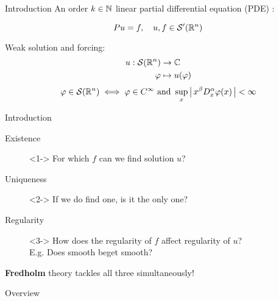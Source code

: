 \documentclass{beamer}
\begin{document}
\begin{frame}{Introduction}
An order $k \in {\ensuremath {\mathbb N}}$ linear partial differential equation (PDE) : 

\begin{equation*}
P u = f, \quad u, f \in \mathcal{S}'({\mathbb R}^n)
\end{equation*}


Weak solution and forcing: 
\begin{align*}
u : \mathcal{S}({\mathbb R}^n) & \to {\ensuremath {\mathbb C}} \\
\varphi &\mapsto u(\varphi)
\end{align*}
\begin{align*}
\varphi  \in \mathcal{S}({\mathbb R}^n)  \iff 
 \varphi \in C^\infty \text{ and }  \sup_{x} \left|\, x^\beta D^\alpha_x \varphi (x)\,\right| < \infty 
\end{align*}

\end{frame} 


\begin{frame}{Introduction}
\begin{description}
    \item[Existence]<1-> For which $f$ can we find solution $u$? 
    \item[Uniqueness ]<2->  If we do find one,  is it the only one? 
    \item[Regularity ]<3-> How does the regularity of $f$ affect regularity of $u$? \\
    E.g. Does smooth beget smooth? 
\end{description}

 \textbf{Fredholm} theory tackles all three simultaneously! 

\end{frame} 



\begin{frame}{Overview}
\tableofcontents
\end{frame}

\end{document}
